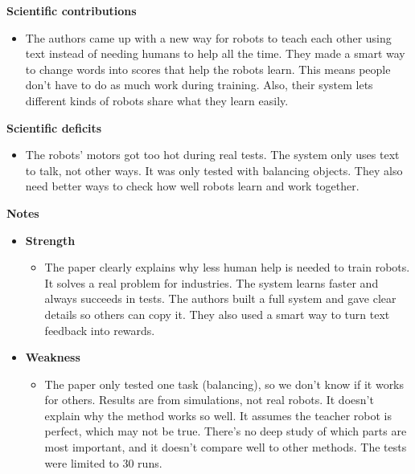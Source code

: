 \documentclass[report.tex]{subfiles}
\begin{document}
\noindent\textbf{Scientific contributions} 
\begin{itemize}
        \item The authors came up with a new way for robots to teach each other using text instead of needing humans to help all the time. They made a smart way to change words into scores that help the robots learn. This means people don’t have to do as much work during training. Also, their system lets different kinds of robots share what they learn easily.
        
\end{itemize}

\noindent\textbf{Scientific deficits} 
\begin{itemize}
        \item The robots’ motors got too hot during real tests. The system only uses text to talk, not other ways. It was only tested with balancing objects. They also need better ways to check how well robots learn and work together.
        
       
\end{itemize}

\noindent\textbf{Notes}
\begin{itemize}
    \item \noindent\textbf {Strength}
    \begin{itemize}
        \item The paper clearly explains why less human help is needed to train robots. It solves a real problem for industries. The system learns faster and always succeeds in tests. The authors built a full system and gave clear details so others can copy it. They also used a smart way to turn text feedback into rewards.
        
       
    \end{itemize}
    
    \item \noindent\textbf{Weakness}
    \begin{itemize}
        \item The paper only tested one task (balancing), so we don’t know if it works for others. Results are from simulations, not real robots. It doesn’t explain why the method works so well. It assumes the teacher robot is perfect, which may not be true. There’s no deep study of which parts are most important, and it doesn’t compare well to other methods. The tests were limited to 30 runs.
    \end{itemize}
\end{itemize}
\end{document}
